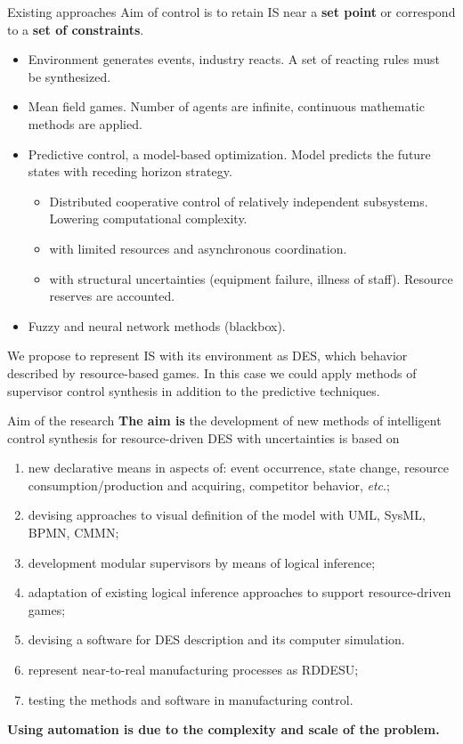 \documentclass[10pt,dvipsnames]{beamer}
\begin{document}
\begin{frame}{Existing approaches}
  Aim of control is to retain IS near a \textbf{set point} or correspond to a \textbf{set of constraints}.
  \begin{itemize}
  \item Environment generates events, industry reacts. A set of reacting rules must be synthesized.
  \item Mean field games. Number of agents are infinite, continuous mathematic methods are applied.
  \item Predictive control, a model-based optimization. Model predicts the future states with \alert{receding horizon} strategy.
    \begin{itemize}
     \item \alert{Distributed cooperative control} of relatively
       independent subsystems. Lowering computational complexity.
     \item with limited resources and asynchronous coordination.
     \item with structural uncertainties (equipment failure, illness of staff). Resource reserves are accounted.
     \end{itemize}
  \item Fuzzy and neural network methods (blackbox).
  \end{itemize}

  We propose to represent IS with its environment as DES, which behavior described by resource-based games.  In this case we could apply methods of supervisor control synthesis in addition to the predictive techniques.

\end{frame}

\begin{frame}{Aim of the research}
\textbf{The aim is} the development of new methods of intelligent control synthesis for resource-driven DES with uncertainties is based on
\begin{enumerate}
\item new declarative means in aspects of: event occurrence, state change, resource consumption/production and acquiring, competitor behavior, \emph{etc}.;
\item devising approaches to visual definition of the model with UML, SysML, BPMN, CMMN;
\item development modular supervisors by means of logical inference;
\item adaptation of existing logical inference approaches to support resource-driven games;
\item devising a software for DES description and its computer simulation.
\item represent near-to-real manufacturing processes as RDDESU;
\item testing the methods and software in manufacturing control.
\end{enumerate}

\textbf{Using automation is due to the complexity and scale of the problem.}
\end{frame}
\end{document}
